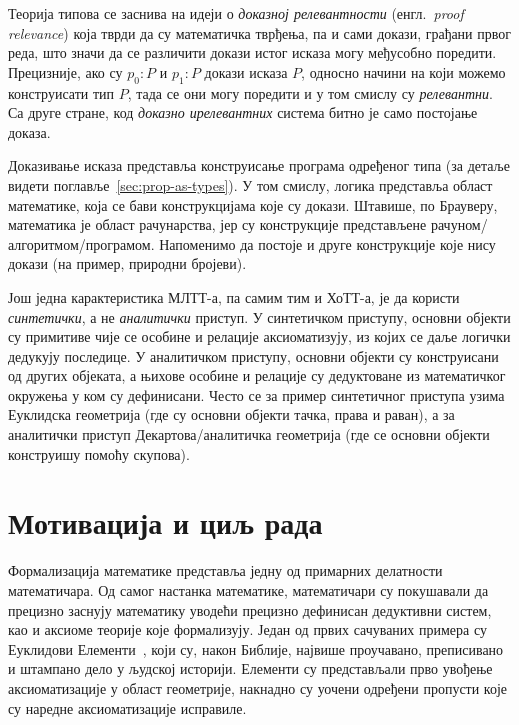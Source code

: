 \documentclass[12pt,oneside]{memoir}
\begin{document}
Теорија типова се заснива на идеји о \emph{доказној релевантности} (енгл.~\emph{proof relevance}) која тврди да су математичка тврђења, па и сами докази, грађани првог реда, што значи да се различити докази истог исказа могу међусобно поредити. Прецизније, ако су $p_0 : P$ и $p_1 : P$ докази исказа $P$, односно начини на који можемо конструисати тип $P$, тада се они могу поредити и у том смислу су \emph{релевантни}. Са друге стране, код \emph{доказно ирелевантних} система битно је само постојање доказа. 

Доказивање исказа представља конструисање програма одређеног типа (за детаље видети поглавље~\ref{sec:prop-as-types}). У том смислу, логика представља област математике, која се бави конструкцијама које су докази. Штавише, по Брауверу, математика је област рачунарства, јер су конструкције представљене рачуном/алгоритмом/програмом. Напоменимо да постоје и друге конструкције које нису докази (на пример, природни бројеви).

Још једна карактеристика МЛТТ-а, па самим тим и ХоТТ-а, је да користи \emph{синтетички}, а не \emph{аналитички} приступ. У синтетичком приступу, основни објекти су примитиве чије се особине и релације аксиоматизују, из којих се даље логички дедукују последице. У аналитичком приступу, основни објекти су конструисани од других објеката, а њихове особине и релације су дедуктоване из математичког окружења у ком су дефинисани. Често се за пример синтетичног приступа узима Еуклидска геометрија (где су основни објекти тачка, права и раван), а за аналитички приступ Декартова/аналитичка геометрија (где се основни објекти конструишу помоћу скупова).

\section{Мотивација и циљ рада}

Формализација математике представља једну од примарних делатности математичара. Од самог настанка математике, математичари су покушавали да прецизно заснују математику уводећи прецизно дефинисан дедуктивни систем, као и аксиоме теорије које формализују. Један од првих сачуваних примера су Еуклидови Елементи~\cite{ee}, који су, након Библије, највише проучавано, преписивано и штампано дело у људској историји. Елементи су представљали прво увођење аксиоматизације у област геометрије, накнадно су уочени одређени пропусти које су наредне аксиоматизације исправиле.
\end{document}
